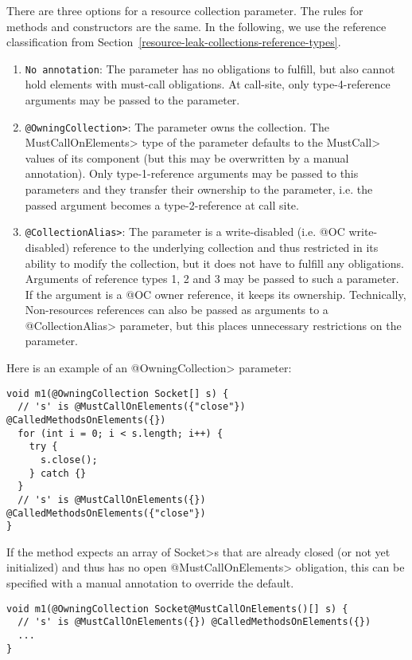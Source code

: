 There are three options for a resource collection parameter. The rules for methods and constructors are the same. In the following, we use the reference classification from Section~\ref{resource-leak-collections-reference-types}.
\begin{enumerate}
  \item \texttt{No annotation}: The parameter has no obligations to fulfill, but also cannot hold elements with must-call obligations. At call-site, only type-4-reference arguments may be passed to the parameter.
  \item \texttt{\<@OwningCollection>}: The parameter owns the collection. The \<MustCallOnElements> type of the parameter defaults to the \<MustCall> values of its component (but this may be overwritten by a manual annotation). Only type-1-reference arguments may be passed to this parameters and they transfer their ownership to the parameter, i.e. the passed argument becomes a type-2-reference at call site.
  \item \texttt{\<@CollectionAlias>}: The parameter is a write-disabled (i.e. @OC write-disabled) reference to the underlying collection and thus restricted in its ability to modify the collection, but it does not have to fulfill any obligations. Arguments of reference types 1, 2 and 3 may be passed to such a parameter. If the argument is a @OC owner reference, it keeps its ownership. Technically, Non-resources references can also be passed as arguments to a \<@CollectionAlias> parameter, but this places unnecessary restrictions on the parameter.
\end{enumerate}

Here is an example of an \<@OwningCollection> parameter:
\begin{verbatim}
void m1(@OwningCollection Socket[] s) {
  // 's' is @MustCallOnElements({"close"}) @CalledMethodsOnElements({})
  for (int i = 0; i < s.length; i++) {
    try {
      s.close();
    } catch {}
  }
  // 's' is @MustCallOnElements({}) @CalledMethodsOnElements({"close"})
}
\end{verbatim}

If the method expects an array of \<Socket>s that are already closed (or not yet initialized) and thus has no open \<@MustCallOnElements> obligation, this can be specified with a manual annotation to override the default.

\begin{verbatim}
void m1(@OwningCollection Socket@MustCallOnElements()[] s) {
  // 's' is @MustCallOnElements({}) @CalledMethodsOnElements({})
  ...
}
\end{verbatim}

